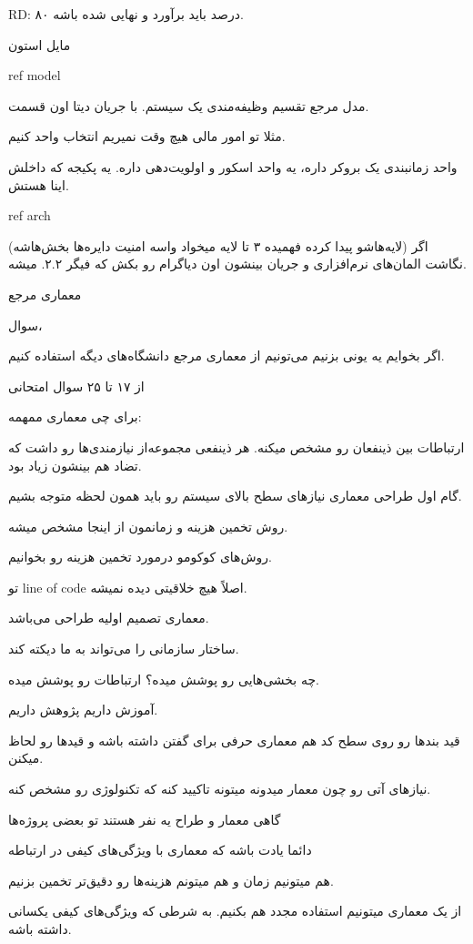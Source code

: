 RD: ۸۰ درصد باید برآورد و نهایی شده باشه.

مایل استون

ref model 

مدل مرجع تقسیم وظیفه‌مندی یک سیستم. با جریان دیتا اون قسمت.

مثلا تو امور مالی هیچ وقت نمیریم انتخاب واحد کنیم.

واحد زمانبندی یک بروکر داره، یه واحد اسکور و اولویت‌دهی داره. یه پکیجه که داخلش
اینا هستش.

ref arch

اگر (لایه‌هاشو پیدا کرده فهمیده ۳ تا لایه میخواد واسه امنیت دایره‌ها بخش‌هاشه)
نگاشت المان‌های نرم‌افزاری و جریان بینشون اون دیاگرام رو بکش که فیگر ۲.۲. میشه.

معماری مرجع

سوال،

اگر بخوایم یه یونی بزنیم می‌تونیم از معماری مرجع دانشگاه‌های دیگه استفاده کنیم.

از ۱۷ تا ۲۵ سوال امتحانی

برای چی معماری ممهمه:

ارتباطات بین ذینفعان رو مشخص میکنه. هر ذینفعی مجموعه‌از نیازمندی‌ها رو داشت که
تضاد هم بینشون زیاد بود.

گام اول طراحی معماری نیاز‌های سطح بالای سیستم رو باید همون لحظه متوجه بشیم.

روش تخمین هزینه و زمانمون از اینجا مشخص میشه.

روش‌های کوکومو درمورد تخمین هزینه رو بخوانیم.

تو line of code اصلاً هیچ خلاقیتی دیده نمیشه.

معماری تصمیم اولیه طراحی می‌باشد.

ساختار سازمانی را می‌تواند به ما دیکته کند.

چه بخشی‌هایی رو پوشش میده؟ ارتباطات رو پوشش میده.

آموزش داریم پژوهش داریم.

قید بند‌ها رو روی سطح کد هم معماری حرفی برای گفتن داشته باشه و قید‌ها رو لحاظ
میکنن.

نیاز‌های آتی رو چون معمار میدونه میتونه تاکیید کنه که تکنولوژی رو مشخص کنه.

گاهی معمار و طراح یه نفر هستند تو بعضی پروژه‌ها

دائما یادت باشه که معماری با ویژگی‌های کیفی در ارتباطه

هم میتونیم زمان و هم میتونم هزینه‌ها رو دقیق‌تر تخمین بزنیم.

از یک معماری میتونیم استفاده مجدد هم بکنیم. به شرطی که ویژگی‌های کیفی یکسانی
داشته باشه.

